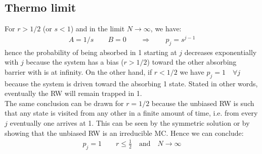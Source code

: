 \documentclass[4apaper,11pt,fleqn]{article}
\theoremstyle{remark}
\theoremstyle{definition}
\begin{document}
\subsection{Thermo limit}
For $r>1/2$ (or $s<1$) and in the limit $N \rightarrow \infty$, we have:
\begin{align}
  \label{eq:asym_limit}
  A = 1/s \qquad B = 0 \qquad \Rightarrow \qquad \boxed{p_j = s^{j-1}}
\end{align}
hence the probability of being absorbed in 1 starting at $j$ decreases exponentially with $j$ because the system has a bias ($r>1/2$) toward the other absorbing barrier with is at infinity. On the other hand, if $r<1/2$ we have $p_j=1 \quad \forall j$ because the system is driven toward the absorbing 1 state. Stated in other words, eventually the RW will remain trapped in 1.\\
The same conclusion can be drawn for $r=1/2$ because the unbiased RW is such that any state is visited from any other in a finite amount of time, i.e. from every $j$ eventually one arrives at 1. This can be seen by the symmetric solution or by showing that the unbiased RW is an irreducible MC.
Hence we can conclude:
\begin{align*}
  p_j = 1 \qquad r \leq \frac{1}{2} \quad \text{and} \quad N \rightarrow \infty
\end{align*}


\end{document}
